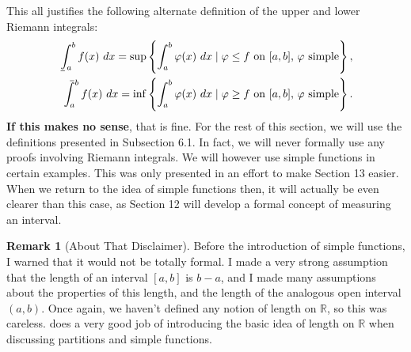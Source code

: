 \documentclass{article}
\def\upint{\mathchoice%
	{\mkern13mu\overline{\vphantom{\intop}\mkern7mu}\mkern-20mu}%
	{\mkern7mu\overline{\vphantom{\intop}\mkern7mu}\mkern-14mu}%
	{\mkern7mu\overline{\vphantom{\intop}\mkern7mu}\mkern-14mu}%
	{\mkern7mu\overline{\vphantom{\intop}\mkern7mu}\mkern-14mu}%
	\int}
\def\lowint{\mkern3mu\underline{\vphantom{\intop}\mkern7mu}\mkern-10mu\int}
\newcommand{\R}{\mathbb{R}}
\theoremstyle{definition}
\newtheorem{remark}{Remark}[section]
\begin{document}
This all justifies the following alternate definition of the upper and lower Riemann integrals:
\begin{align*}
\lowint_a^b f(x)\ dx=\sup \left\{\int_a^b\varphi(x)\ dx\mid \varphi\le f\text{ on }[a,b]\text{, } \varphi\text{ simple}\right\},\\
\upint_a^b f(x)\ dx=\inf\left\{\int_a^b\varphi(x)\ dx\mid \varphi\ge f\text{ on }[a,b]\text{, } \varphi\text{ simple}\right\}.
\end{align*} 
\textbf{\color{red}If this makes no sense}, that is fine. For the rest of this section, we will use the definitions presented in Subsection 6.1. In fact, we will never formally use any proofs involving Riemann integrals. We will however use simple functions in certain examples. This was only presented in an effort to make Section 13 easier. When we return to the idea of simple functions then, it will actually be even clearer than this case, as Section 12 will develop a formal concept of measuring an interval.  
\begin{remark}[About That Disclaimer]
	Before the introduction of simple functions, I warned that it would not be totally formal. I made a very strong assumption that the length of an interval $ [a,b] $ is $ b-a $, and I made many assumptions about the properties of this length, and the length of the analogous open interval $ (a,b) $. Once again, we haven't defined any notion of length on $ \R $, so this was careless. \cite{tao2006analysis} does a very good job of introducing the basic idea of length on $ \R $ when discussing partitions and simple functions. 
\end{remark}
\end{document}
